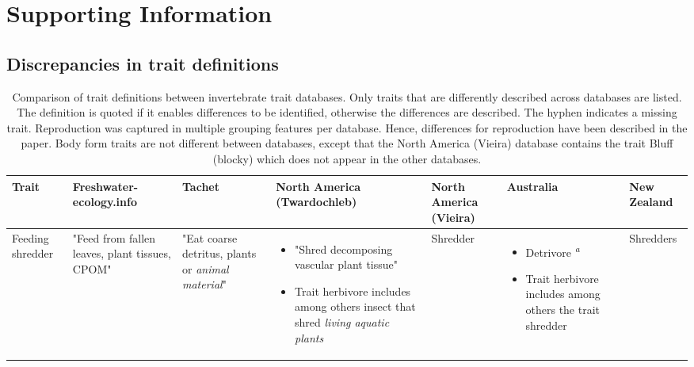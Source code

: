 \documentclass[../Draft_harmonization_paper.tex]{subfiles}
\begin{document}
\section*{Supporting Information}
\label{sec:SI}

\subsection*{Discrepancies in trait definitions}

\begin{landscape}
    \begin{longtable}{m{1.8cm}|m{3cm}|m{3cm}|m{3cm}|m{3cm}|m{3cm}|m{3cm}}
        \caption{Comparison of trait definitions between invertebrate trait databases. Only traits that are differently described across databases are listed. The definition is quoted if it enables differences to be identified, otherwise the differences are described. The hyphen indicates a missing trait. Reproduction was captured in multiple grouping features per database. Hence, differences for reproduction have been described in the paper. Body form traits are not different between databases, except that the North America (Vieira) database contains the trait Bluff (blocky) which does not appear in the other databases.}
        \label{stab:trait_definitions}
        \endfirsthead
        \toprule[.1em]
        Trait & \specialcell{Freshwater- \\ ecology.info} & Tachet & \specialcell{North America \\ (Twardochleb)} & 
        North America (Vieira) & Australia & New Zealand \\
        \toprule[.1em]
        Feeding shredder & 
        "Feed from fallen leaves, plant tissues, CPOM" & 
        "Eat coarse detritus, plants or \textit{animal material}" & 
        \begin{itemize}
            \item "Shred decomposing vascular plant tissue"
            \item Trait herbivore includes among others insect that shred \textit{living aquatic plants} 
        \end{itemize} & 
        Shredder & 
        \begin{itemize}
            \item Detrivore \textsuperscript{\textit{a}}
            \item Trait herbivore includes among others the trait shredder
        \end{itemize} & 
        Shredders

\end{longtable}
\end{landscape}
\end{document}
